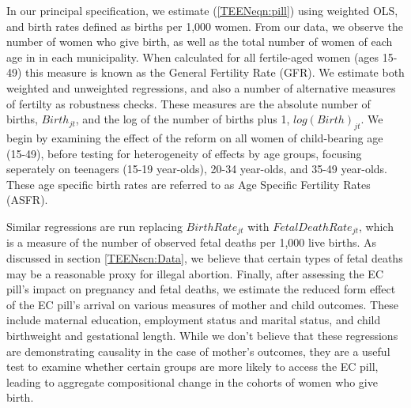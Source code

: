 In our principal specification, we estimate (\ref{TEENeqn:pill}) using weighted
OLS, and birth rates defined as births per 1,000 women.  From our data, we
observe the number of women who give birth, as well as the total number of women
of each age in in each municipality.  When calculated for all fertile-aged women
(ages 15-49) this measure is known as the General Fertility Rate (GFR).
We estimate both weighted and unweighted regressions, and also a number of
alternative measures of fertilty as robustness checks.  These measures are the
absolute number of births, $Birth_{jt}$, and the log of the number of births
plus 1, $log(Birth)_{jt}$.  We begin by examining the effect of the reform on
all women of child-bearing age (15-49), before testing for heterogeneity of
effects by age groups, focusing seperately on teenagers (15-19 year-olds), 20-34
year-olds, and 35-49 year-olds.  These age specific birth rates are referred to
as Age Specific Fertility Rates (ASFR).

Similar regressions are run replacing $BirthRate_{jt}$ with
$FetalDeathRate_{jt}$, which is a measure of the number of observed fetal deaths
per 1,000 live births.  As discussed in section \ref{TEENscn:Data}, we believe
that certain types of fetal deaths may be a reasonable proxy for illegal
abortion. Finally, after assessing the EC pill's impact on pregnancy and fetal
deaths, we estimate the reduced form effect of the EC pill's arrival on various
measures of mother and child outcomes.  These include maternal education,
employment status and marital status, and child birthweight and gestational
length.  While we don't believe that these regressions are demonstrating
causality in the case of mother's outcomes, they are a useful test to examine
whether certain groups are more likely to access the EC pill, leading to aggregate
compositional change in the cohorts of women who give birth.

